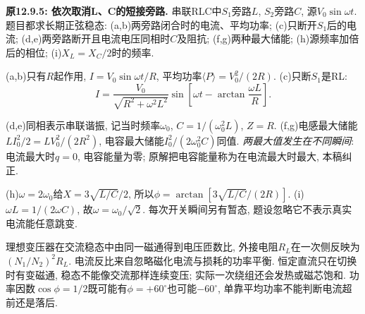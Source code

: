 \begin{example}
\textbf{原12.9.5: 依次取消L、C的短接旁路.} 串联RLC中$S_1$旁路$L$, $S_2$旁路$C$, 源$V_0\sin\omega t$. 题目都求长期正弦稳态: (a,b)两旁路闭合时的电流、平均功率; (c)只断开$S_1$后的电流; (d,e)两旁路断开且电流电压同相时$C$及阻抗; (f,g)两种最大储能; (h)源频率加倍后的相位; (i)$X_L=X_C/2$时的频率.
\end{example}
\begin{solution}
(a,b)只有$R$起作用, $I=V_0\sin\omega t/R$, 平均功率$\langle P\rangle=V_0^2/(2R)$.
(c)只断$S_1$是RL:
\[I=\frac{V_0}{\sqrt{R^2+\omega^2L^2}}\sin\left[\omega t-\arctan\frac{\omega L}{R}\right].\]

(d,e)同相表示串联谐振, 记当时频率$\omega_0$, $C=1/(\omega_0^2L)$, $Z=R$. (f,g)电感最大储能$LI_0^2/2=LV_0^2/(2R^2)$, 电容最大储能$I_0^2/(2\omega_0^2C)$同值. \emph{两最大值发生在不同瞬间}: 电流最大时$q=0$, 电容能量为零; 原解把电容能量称为在电流最大时最大, 本稿纠正.

(h)$\omega=2\omega_0$给$X=3\sqrt{L/C}/2$, 所以$\phi=\arctan[3\sqrt{L/C}/(2R)]$. (i)$\omega L=1/(2\omega C)$, 故$\omega=\omega_0/\sqrt2$. 每次开关瞬间另有暂态, 题设忽略它不表示真实电流能任意跳变.
\end{solution}

理想变压器在交流稳态中由同一磁通得到电压匝数比, 外接电阻$R_L$在一次侧反映为$(N_1/N_2)^2R_L$. 电流反比来自忽略磁化电流与损耗的功率平衡. 恒定直流只在切换时有变磁通, 稳态不能像交流那样连续变压; 实际一次绕组还会发热或磁芯饱和. 功率因数$\cos\phi=1/2$既可能有$\phi=+60^\circ$也可能$-60^\circ$, 单靠平均功率不能判断电流超前还是落后.
